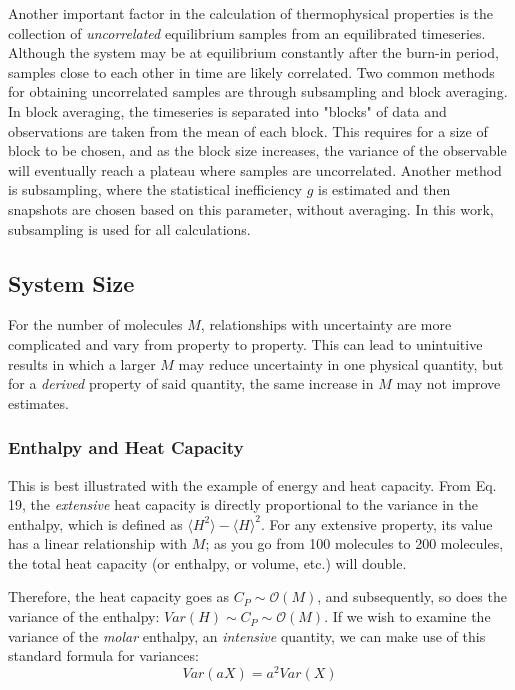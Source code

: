 \documentclass[9pt,bestpractices]{livecoms}
\begin{document}
Another important factor in the calculation of thermophysical properties is the collection of \emph{uncorrelated} equilibrium samples from an equilibrated timeseries.  Although the system may be at equilibrium constantly after the burn-in period, samples close to each other in time are likely correlated.  Two common methods for obtaining uncorrelated samples are through subsampling and block averaging.  In block averaging, the timeseries is separated into "blocks" of data and observations are taken from the mean of each block.  This requires for a size of block to be chosen, and as the block size increases, the variance of the observable will eventually reach a plateau where samples are uncorrelated.  Another method is subsampling, where the statistical inefficiency $g$ is estimated and then snapshots are chosen based on this parameter, without averaging.  In this work, subsampling is used for all calculations.

\subsection{System Size}
For the number of molecules $M$, relationships with uncertainty are more complicated and vary from property to property.   This can lead to unintuitive results in which a larger $M$ may reduce uncertainty in one physical quantity, but for a \emph{derived} property of said quantity, the same increase in $M$ may not improve estimates.
\subsubsection{Enthalpy and Heat Capacity}
This is best illustrated with the example of energy and heat capacity.  From Eq. 19, %
the \emph{extensive} heat capacity is directly proportional to the variance in the enthalpy, which is defined as $\langle H^2 \rangle - \langle H \rangle^2$.  For any extensive property, its value has a linear relationship with $M$; as you go from 100 molecules to 200 molecules, the total heat capacity (or enthalpy, or volume, etc.) will double.

Therefore, the heat capacity goes as $C_P \sim \mathcal{O}(M)$, and subsequently, so does the variance of the enthalpy: $ Var(H) \sim C_P \sim \mathcal{O}(M) $.  If we wish to examine the variance of the \emph{molar} enthalpy, an \emph{intensive} quantity, we can make use of this standard formula for variances:
\begin{equation}
Var(aX)=a^2Var(X)
\end{equation}
\end{document}
